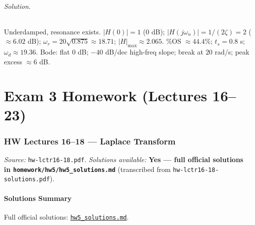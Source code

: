 \documentclass[11pt]{article}
\begin{document}
\paragraph{Solution.} Underdamped, resonance exists. $|H(0)|=1$ (0 dB); $|H(j\omega_n)| = 1/(2\zeta) = 2$ ($\approx 6.02$ dB); $\omega_r = 20\sqrt{0.875}\approx 18.71$; $|H|_{\max}\approx 2.065$. \%OS $\approx 44.4\%$; $t_s = 0.8$ s; $\omega_d\approx 19.36$. Bode: flat 0 dB; $-40$ dB/dec high-freq slope; break at $20$ rad/s; peak excess $\approx 6$ dB.

\newpage
\part{Exam 3 Homework (Lectures 16--23)}

\section{HW Lectures 16--18 --- Laplace Transform}
\emph{Source:} \texttt{hw-lctr16-18.pdf}. \emph{Solutions available:} \textbf{Yes --- full official solutions in \texttt{homework/hw5/hw5\_solutions.md}} (transcribed from \texttt{hw-lctr16-18-solutions.pdf}).

\subsection*{Solutions Summary}

Full official solutions: \href{../homework/hw5/hw5_solutions.md}{\texttt{hw5\_solutions.md}}.
\end{document}
